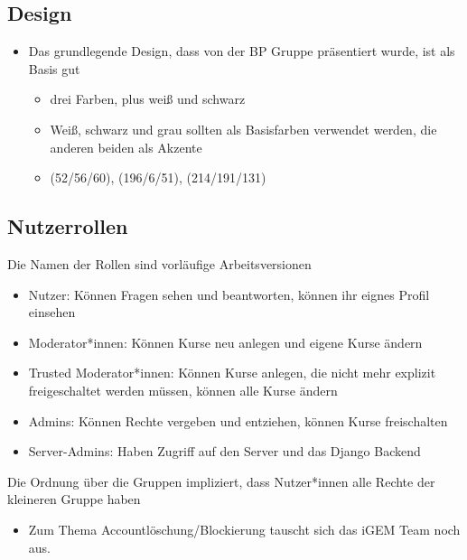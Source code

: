 \documentclass[colorback, accentcolor=tud1c, paper=a4]{tudexercise}
\begin{document}
\begin{multicols}{2}
		\subsection*{Design}
		\begin{itemize}
			\item Das grundlegende Design, dass von der BP Gruppe präsentiert wurde, ist als Basis gut
			\begin{itemize}
				\item drei Farben, plus weiß und schwarz
				\item Weiß, schwarz und grau sollten als Basisfarben verwendet werden, die anderen beiden als Akzente
				\item (52/56/60), (196/6/51), (214/191/131)
			\end{itemize}
		\end{itemize}
		
		\subsection*{Nutzerrollen}
		Die Namen der Rollen sind vorläufige Arbeitsversionen
		\begin{itemize}
			\item Nutzer: Können Fragen sehen und beantworten, können ihr eignes Profil einsehen
			\item Moderator*innen: Können Kurse neu anlegen und eigene Kurse ändern
			\item Trusted Moderator*innen: Können Kurse anlegen, die nicht mehr explizit freigeschaltet werden müssen, können alle Kurse ändern
			\item Admins: Können Rechte vergeben und entziehen, können Kurse freischalten
			\item Server-Admins: Haben Zugriff auf den Server und das Django Backend
		\end{itemize}
		Die Ordnung über die Gruppen impliziert, dass Nutzer*innen alle Rechte der kleineren Gruppe haben
		\begin{itemize}
			\item Zum Thema Accountlöschung/Blockierung tauscht sich das iGEM Team noch aus.
		\end{itemize}
		

\end{multicols}
\end{document}
